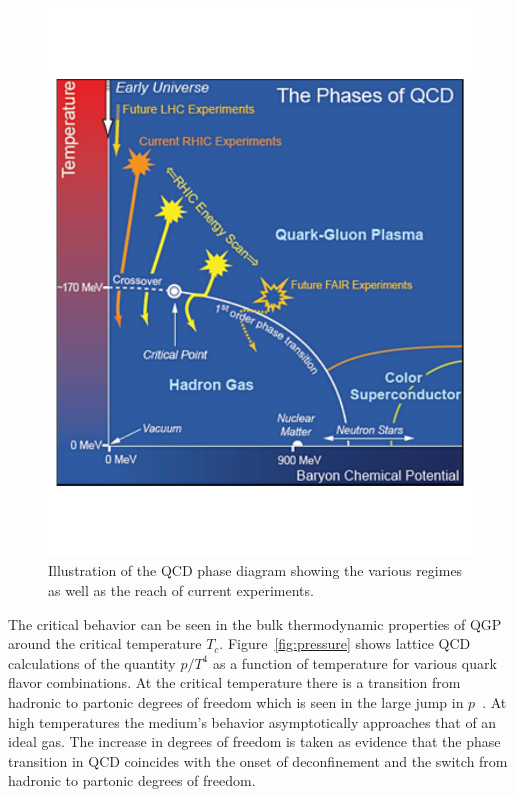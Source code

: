 \begin{figure}[htbp]
\begin{center}
\includegraphics[scale=0.5]{Plots/Intro/qcd_phase.pdf}
\end{center}
\caption[QCD Phase Diagram]{Illustration of the QCD phase diagram showing the various regimes as well as the reach of current experiments.}
\label{fig:qcd_phase}
\end{figure}

The critical behavior can be seen in the bulk thermodynamic properties of QGP around the critical temperature $T_c$. Figure~\ref{fig:pressure} shows lattice QCD calculations of the quantity $p/T^4$ as a function of temperature for various quark flavor combinations. At the critical temperature there is a transition from hadronic to partonic degrees of freedom which is seen in the large jump in $p$~\cite{hitempQCD}. At high temperatures the medium's behavior asymptotically approaches that of an ideal gas. The increase in degrees of freedom is taken as evidence that the phase transition in QCD coincides with the onset of deconfinement and the switch from hadronic to partonic degrees of freedom.


